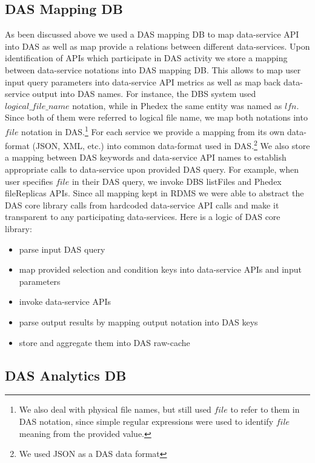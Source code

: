 \documentclass[a4paper]{jpconf}
\begin{document}
\subsection{DAS Mapping DB}
As been discussed above we used a DAS mapping DB to map data-service API into
DAS as well as map provide a relations between different data-services.
Upon identification of APIs which participate in DAS activity 
we store a mapping between data-service notations
into DAS mapping DB. This allows to map user input query parameters into
data-service API metrics as well as map back data-service output into DAS names.
For instance, the DBS system used $logical\_file\_name$ notation, while in Phedex
the same entity was named as $lfn$. Since both of them were referred to
logical file name, we map both notations into $file$ notation in DAS.\footnote{We
also deal with physical file names, but still used $file$ to refer to them in
DAS notation, since simple regular expressions were used to identify $file$
meaning from the provided value.}
For each service we provide a mapping from its own data-format (JSON, XML, etc.) into
common data-format used in DAS.\footnote{We used JSON as a DAS data format}
We also store a mapping between DAS keywords and data-service API names to
establish appropriate calls to data-service upon provided DAS query. For example,
when user specifies $file$ in their DAS query, we invoke DBS listFiles and Phedex
fileReplicas APIs. Since all mapping kept in RDMS we were able to abstract the 
DAS core library calls from hardcoded data-service API calls and make it
transparent to any participating data-services. Here is a logic of DAS core
library:
\begin{itemize}
\item parse input DAS query
\item map provided selection and condition keys into data-service APIs and
input parameters
\item invoke data-service APIs
\item parse output results by mapping output notation into DAS keys
\item store and aggregate them into DAS raw-cache
\end{itemize} 

\subsection{DAS Analytics DB}
\end{document}
